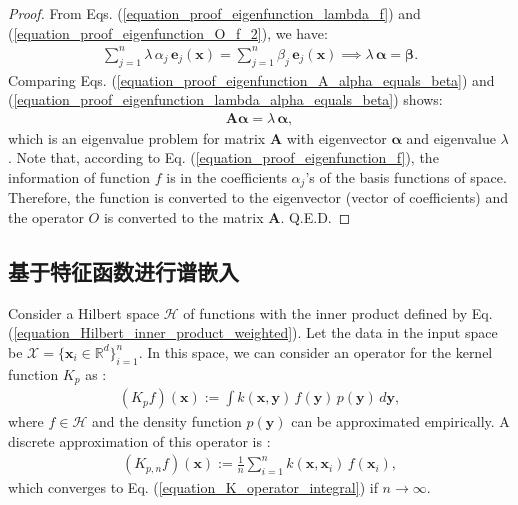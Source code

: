 \documentclass[lang=cn,10pt]{gorgeousnbook}
\numberwithin{equation}{section}%
\numberwithin{figure}{section}%
\begin{document}
\begin{proof}
From Eqs. (\ref{equation_proof_eigenfunction_lambda_f}) and (\ref{equation_proof_eigenfunction_O_f_2}), we have:
\begin{align}\label{equation_proof_eigenfunction_lambda_alpha_equals_beta}
\sum_{j=1}^n \lambda\, \alpha_j\, \boldsymbol{e}_j(\boldsymbol{x}) = \sum_{j=1}^n \beta_j\, \boldsymbol{e}_j(\boldsymbol{x}) \implies \lambda\, \boldsymbol{\alpha} = \boldsymbol{\beta}.
\end{align}
Comparing Eqs. (\ref{equation_proof_eigenfunction_A_alpha_equals_beta}) and (\ref{equation_proof_eigenfunction_lambda_alpha_equals_beta}) shows:
\begin{align*}
\boldsymbol{A} \boldsymbol{\alpha} = \lambda\, \boldsymbol{\alpha},
\end{align*}
which is an eigenvalue problem for matrix $\boldsymbol{A}$ with eigenvector $\boldsymbol{\alpha}$ and eigenvalue $\lambda$ \cite{ghojogh2019eigenvalue}. 
Note that, according to Eq. (\ref{equation_proof_eigenfunction_f}), the information of function $f$ is in the coefficients $\alpha_j$'s of the basis functions of space. Therefore, the function is converted to the eigenvector (vector of coefficients) and the operator $O$ is converted to the matrix $\boldsymbol{A}$. Q.E.D.
\end{proof}

\subsection{基于特征函数进行谱嵌入} \label{section_eigenfunctions_for_spectral_embedding}

Consider a Hilbert space $\mathcal{H}$ of functions with the inner product defined by Eq. (\ref{equation_Hilbert_inner_product_weighted}). Let the data in the input space be $\mathcal{X} = \{\boldsymbol{x}_i \in \mathbb{R}^d\}_{i=1}^n$.
In this space, we can consider an operator for the kernel function $K_p$ as \cite{williams2000effect}:
\begin{align}\label{equation_K_operator_integral}
(K_p f)(\boldsymbol{x}) := \int k(\boldsymbol{x},\boldsymbol{y})\, f(\boldsymbol{y})\, p(\boldsymbol{y})\, d\boldsymbol{y},
\end{align}
where $f \in \mathcal{H}$ and the density function $p(\boldsymbol{y})$ can be approximated empirically. 
A discrete approximation of this operator is \cite{williams2000effect}:
\begin{align}\label{equation_discrete_kernel_operator}
(K_{p,n} f)(\boldsymbol{x}) := \frac{1}{n} \sum_{i=1}^n k(\boldsymbol{x},\boldsymbol{x}_i)\, f(\boldsymbol{x}_i),
\end{align}
which converges to Eq. (\ref{equation_K_operator_integral}) if $n \rightarrow \infty$. 
\end{document}
